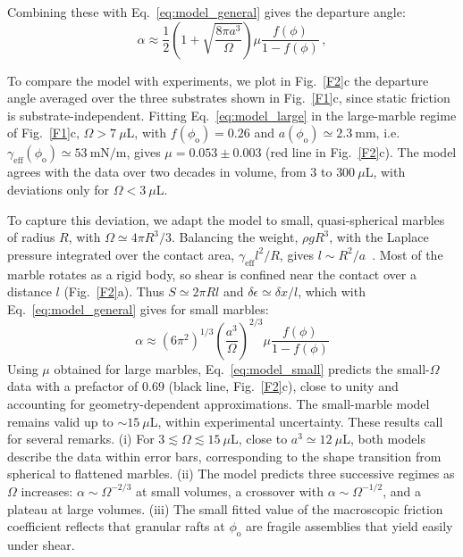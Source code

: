 \documentclass[twocolumn, prl,
 amsmath,amssymb,
 superscriptaddress,aps,
]{revtex4-2}
\begin{document}
Combining these with Eq.~\ref{eq:model_general} gives the departure angle:
\begin{equation}
    \alpha\approx  \frac{1}{2}\left({1+\sqrt{\frac{8\pi a^3}{\Omega}}}\right)\mu \frac{f(\phi)}{1-f(\phi)} \, ,
    \label{eq:model_large}
\end{equation}

To compare the model with experiments, we plot in Fig.~\ref{F2}c the departure angle averaged over the three substrates shown in Fig.~\ref{F1}c, since static friction is substrate-independent. Fitting Eq.~\ref{eq:model_large} in the large-marble regime of Fig.~\ref{F1}c, $\Omega>7~\mu$L, with $f(\phi_\mathrm{o})=0.26$ and $a(\phi_\mathrm{o})\simeq2.3~\mathrm{mm}$, i.e. $\gamma_\mathrm{eff}(\phi_\mathrm{o})\simeq53~\mathrm{mN/m}$, gives $\mu=0.053 \pm 0.003$ (red line in Fig.~\ref{F2}c). The model agrees with the data over two decades in volume, from $3$ to $300~\mu$L, with deviations only for $\Omega<3~\mu$L.


To capture this deviation, we adapt the model to small, quasi-spherical marbles of radius $R$, with $\Omega\simeq4\pi R^3/3$. Balancing the weight, $\rho gR^3$, with the Laplace pressure integrated over the contact area, $\gamma_{\mathrm{eff}}l^2/R$, gives $l\sim R^2/a$~\cite{mahadevan1999rolling}. Most of the marble rotates as a rigid body, so shear is confined near the contact over a distance $l$ (Fig.~\ref{F2}a). Thus $S\simeq2\pi Rl$ and $\delta\epsilon\simeq\delta x/l$, which with Eq.~\ref{eq:model_general} gives for small marbles:
\begin{equation}
    \alpha \approx \left({6\pi^2}\right)^{1/3} \left( \frac{a^3}{\Omega}\right) ^{2/3} \mu \frac{f(\phi)}{1-f(\phi)}
    \label{eq:model_small}
\end{equation}
Using $\mu$ obtained for large marbles, Eq.~\ref{eq:model_small} predicts the small-$\Omega$ data with a prefactor of $0.69$ (black line, Fig.~\ref{F2}c), close to unity and accounting for geometry-dependent approximations. The small-marble model remains valid up to $\sim15~\mu$L, within experimental uncertainty.
These results call for several remarks. (i) For $3\lesssim\Omega\lesssim15~\mu$L, close to $a^3\simeq12~\mu$L, both models describe the data within error bars, corresponding to the shape transition from spherical to flattened marbles. (ii) The model predicts three successive regimes as $\Omega$ increases: $\alpha\sim\Omega^{-2/3}$ at small volumes, a crossover with $\alpha\sim\Omega^{-1/2}$, and a plateau at large volumes.
(iii) The small fitted value of the macroscopic friction coefficient reflects that granular rafts at $\phi_\mathrm{o}$ are fragile assemblies that yield easily under shear.
\end{document}
